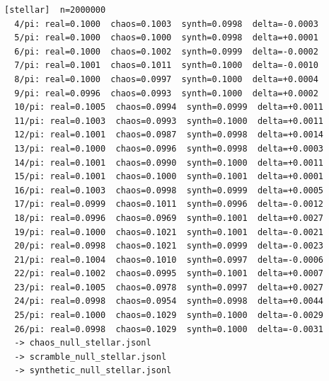 \documentclass[11pt, letterpaper, openany]{book}
\begin{document}
\begin{empiricalbox}
\begin{lstlisting}[style=terminal]
[stellar]  n=2000000
  4/pi: real=0.1000  chaos=0.1003  synth=0.0998  delta=-0.0003
  5/pi: real=0.1000  chaos=0.1000  synth=0.0998  delta=+0.0001
  6/pi: real=0.1000  chaos=0.1002  synth=0.0999  delta=-0.0002
  7/pi: real=0.1001  chaos=0.1011  synth=0.1000  delta=-0.0010
  8/pi: real=0.1000  chaos=0.0997  synth=0.1000  delta=+0.0004
  9/pi: real=0.0996  chaos=0.0993  synth=0.1000  delta=+0.0002
  10/pi: real=0.1005  chaos=0.0994  synth=0.0999  delta=+0.0011
  11/pi: real=0.1003  chaos=0.0993  synth=0.1000  delta=+0.0011
  12/pi: real=0.1001  chaos=0.0987  synth=0.0998  delta=+0.0014
  13/pi: real=0.1000  chaos=0.0996  synth=0.0998  delta=+0.0003
  14/pi: real=0.1001  chaos=0.0990  synth=0.1000  delta=+0.0011
  15/pi: real=0.1001  chaos=0.1000  synth=0.1001  delta=+0.0001
  16/pi: real=0.1003  chaos=0.0998  synth=0.0999  delta=+0.0005
  17/pi: real=0.0999  chaos=0.1011  synth=0.0996  delta=-0.0012
  18/pi: real=0.0996  chaos=0.0969  synth=0.1001  delta=+0.0027
  19/pi: real=0.1000  chaos=0.1021  synth=0.1001  delta=-0.0021
  20/pi: real=0.0998  chaos=0.1021  synth=0.0999  delta=-0.0023
  21/pi: real=0.1004  chaos=0.1010  synth=0.0997  delta=-0.0006
  22/pi: real=0.1002  chaos=0.0995  synth=0.1001  delta=+0.0007
  23/pi: real=0.1005  chaos=0.0978  synth=0.0997  delta=+0.0027
  24/pi: real=0.0998  chaos=0.0954  synth=0.0998  delta=+0.0044
  25/pi: real=0.1000  chaos=0.1029  synth=0.1000  delta=-0.0029
  26/pi: real=0.0998  chaos=0.1029  synth=0.1000  delta=-0.0031
  -> chaos_null_stellar.jsonl
  -> scramble_null_stellar.jsonl
  -> synthetic_null_stellar.jsonl


\end{lstlisting}
\end{empiricalbox}
\end{document}
